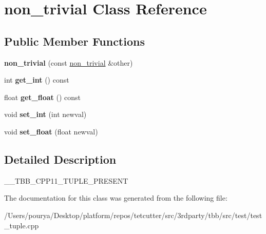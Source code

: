 \hypertarget{classnon__trivial}{}\section{non\+\_\+trivial Class Reference}
\label{classnon__trivial}
\subsection*{Public Member Functions}
\begin{DoxyCompactItemize}
\item 
\hypertarget{classnon__trivial_afbbbf8271e9224d1dcd6d68e5e052d5f}{}{\bfseries non\+\_\+trivial} (const \hyperlink{classnon__trivial}{non\+\_\+trivial} \&other)\label{classnon__trivial_afbbbf8271e9224d1dcd6d68e5e052d5f}

\item 
\hypertarget{classnon__trivial_a779fd677d57ed788466aab7ccb8f45b2}{}int {\bfseries get\+\_\+int} () const \label{classnon__trivial_a779fd677d57ed788466aab7ccb8f45b2}

\item 
\hypertarget{classnon__trivial_abeced719ad843cf6a6903409d689aa75}{}float {\bfseries get\+\_\+float} () const \label{classnon__trivial_abeced719ad843cf6a6903409d689aa75}

\item 
\hypertarget{classnon__trivial_a19b4427397679ce0941555bb52aad6dd}{}void {\bfseries set\+\_\+int} (int newval)\label{classnon__trivial_a19b4427397679ce0941555bb52aad6dd}

\item 
\hypertarget{classnon__trivial_aea118b47ea304217f92c1bb118ec3df2}{}void {\bfseries set\+\_\+float} (float newval)\label{classnon__trivial_aea118b47ea304217f92c1bb118ec3df2}

\end{DoxyCompactItemize}


\subsection{Detailed Description}
\+\_\+\+\_\+\+T\+B\+B\+\_\+\+C\+P\+P11\+\_\+\+T\+U\+P\+L\+E\+\_\+\+P\+R\+E\+S\+E\+N\+T 

The documentation for this class was generated from the following file\+:\begin{DoxyCompactItemize}
\item 
/\+Users/pourya/\+Desktop/platform/repos/tetcutter/src/3rdparty/tbb/src/test/test\+\_\+tuple.\+cpp\end{DoxyCompactItemize}
